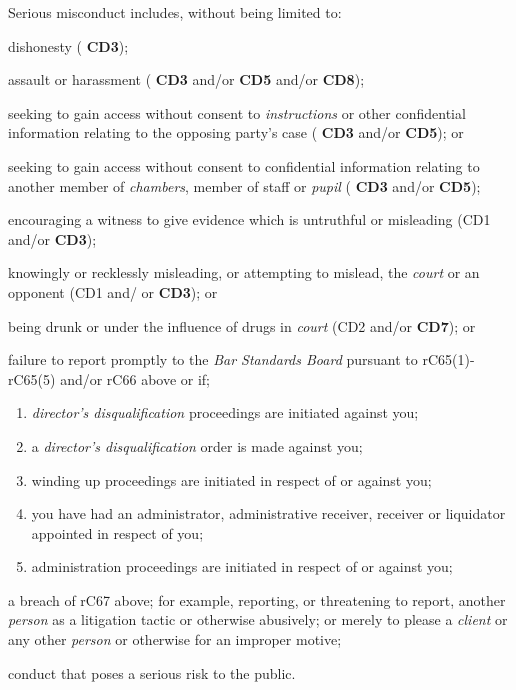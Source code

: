 Serious misconduct includes, without being limited to:
\begin{numlist}\item dishonesty ( \textbf{\textcolor{mygold}{CD3}});
\item assault or harassment ( \textbf{\textcolor{mygold}{CD3}} and/or  \textbf{\textcolor{mygold}{CD5}} and/or  \textbf{\textcolor{mygold}{CD8}});
\item seeking to gain access without consent to \emph{instructions} or
other confidential information relating to the opposing party's case
( \textbf{\textcolor{mygold}{CD3}} and/or  \textbf{\textcolor{mygold}{CD5}}); or
\item seeking to gain access without consent to confidential information
relating to another member of \emph{chambers}, member of staff or
\emph{pupil} ( \textbf{\textcolor{mygold}{CD3}} and/or  \textbf{\textcolor{mygold}{CD5}});
\item encouraging a witness to give evidence which is untruthful or
misleading (CD1 and/or  \textbf{\textcolor{mygold}{CD3}});
\item knowingly or recklessly misleading, or attempting to mislead, the
\emph{court} or an opponent (CD1 and/ or  \textbf{\textcolor{mygold}{CD3}}); or
\item being drunk or under the influence of drugs in \emph{court} (CD2
and/or  \textbf{\textcolor{mygold}{CD7}}); or
\item failure to report promptly to the \emph{Bar Standards Board} pursuant
to rC65(1)-rC65(5) and/or rC66 above or if;
\begin{enumerate}[label=•]
\item \emph{director's disqualification} proceedings are initiated against
you;

\item a \emph{director's disqualification} order is made against you;

\item winding up proceedings are initiated in respect of or against you;

\item you have had an administrator, administrative receiver, receiver or
liquidator appointed in respect of you;

\item administration proceedings are initiated in respect of or against you;

\end{enumerate}
\item a breach of rC67 above; for example, reporting, or threatening to
report, another \emph{person} as a litigation tactic or otherwise
abusively; or merely to please a \emph{client} or any other
\emph{person} or otherwise for an improper motive;~
\item conduct that poses a serious risk to the public.
\end{numlist}
